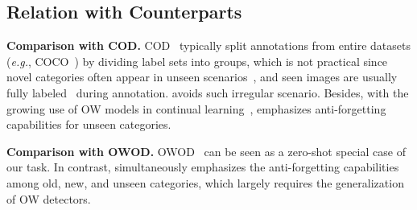 \subsection{Relation with Counterparts}\label{sec:data_relation}
\noindent\textbf{Comparison with COD. }
COD~\cite{dong2023incremental,liu2023continual,deng2024zero,zhang2024dynamic} typically split annotations from entire datasets (\emph{e.g.}, COCO~\cite{lin2014microsoft}) by dividing label sets into groups, which is not practical since novel categories often appear in unseen scenarios~\cite{wang2021wanderlust,continual_autodrive}, and seen images are usually fully labeled~\cite{objects365,lin2014microsoft,wang2023v3det} during annotation. {\method} avoids such irregular scenario.%
Besides, with the growing use of OW models in continual learning~\cite{yu2024boosting,wang2022learning}, {\dataset} emphasizes anti-forgetting capabilities for unseen categories. %

\noindent\textbf{Comparison with OWOD. }OWOD~\cite{li2021grounded,wang2024ov,zhang2022glipv2,bansal2018zero,ma2022open} can be seen as a zero-shot special case of our task. In contrast, {\dataset} simultaneously emphasizes the anti-forgetting capabilities among old, new, and unseen categories, which largely requires the generalization of OW detectors.

